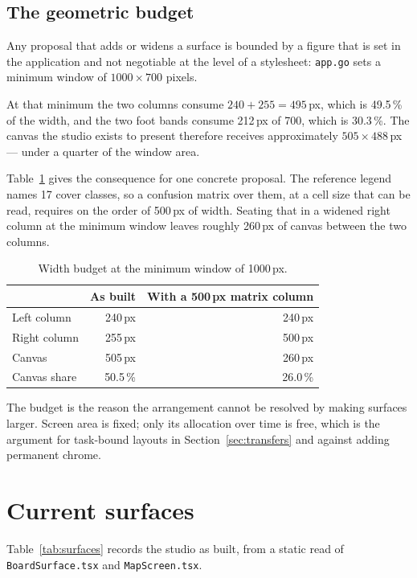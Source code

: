 \documentclass[11pt,a4paper]{article}
\newcommand{\code}[1]{\texttt{\small #1}}
\begin{document}
\subsection{The geometric budget}
\label{sec:budget}

Any proposal that adds or widens a surface is bounded by a figure that is set in
the application and not negotiable at the level of a stylesheet:
\code{app.go} sets a minimum window of $1000 \times 700$ pixels.

At that minimum the two columns consume $240 + 255 = 495$\,px, which is
49.5\,\% of the width, and the two foot bands consume 212\,px of 700, which is
30.3\,\%. The canvas the studio exists to present therefore receives
approximately $505 \times 488$\,px --- under a quarter of the window area.

Table~\ref{tab:budget} gives the consequence for one concrete proposal. The
reference legend names 17 cover classes, so a confusion matrix over them, at a
cell size that can be read, requires on the order of 500\,px of width. Seating
that in a widened right column at the minimum window leaves roughly 260\,px of
canvas between the two columns.

\begin{table}[h]
\centering
\small
\caption{Width budget at the minimum window of 1000\,px.}
\label{tab:budget}
\begin{tabular}{@{}lrr@{}}
\toprule
& As built & With a 500\,px matrix column \\
\midrule
Left column   & 240\,px & 240\,px \\
Right column  & 255\,px & 500\,px \\
Canvas        & 505\,px & 260\,px \\
\midrule
Canvas share  & 50.5\,\% & 26.0\,\% \\
\bottomrule
\end{tabular}
\end{table}

The budget is the reason the arrangement cannot be resolved by making surfaces
larger. Screen area is fixed; only its allocation over time is free, which is
the argument for task-bound layouts in Section~\ref{sec:transfers} and against
adding permanent chrome.

\section{Current surfaces}

Table~\ref{tab:surfaces} records the studio as built, from a static read of
\code{BoardSurface.tsx} and \code{MapScreen.tsx}.
\end{document}
